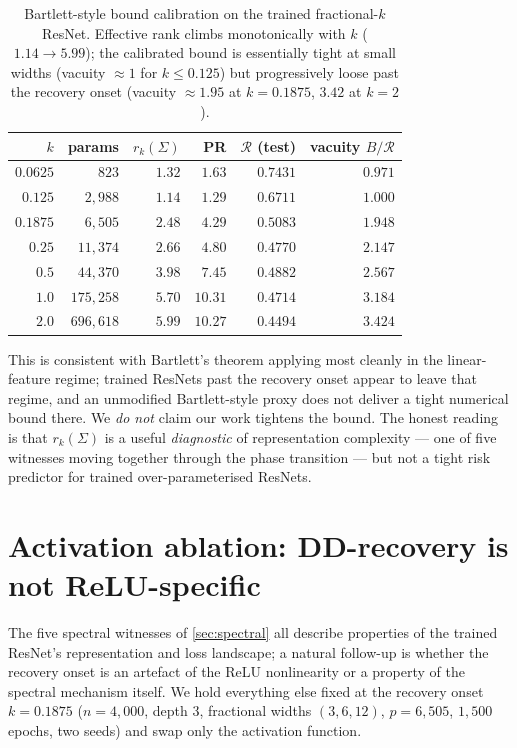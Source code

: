 \begin{table}[t]
  \centering
  \small
  \caption{Bartlett-style bound calibration on the trained fractional-$k$ ResNet. Effective rank climbs monotonically with $k$ ($1.14\!\to\!5.99$); the calibrated bound is essentially tight at small widths (vacuity $\approx 1$ for $k \le 0.125$) but progressively loose past the recovery onset (vacuity $\approx 1.95$ at $k\!=\!0.1875$, $3.42$ at $k\!=\!2$).}
  \label{tab:bartlett-vacuity}
  \begin{tabular}{@{}rrrrrr@{}}
    \toprule
    $k$ & params & $r_k(\Sigma)$ & PR & $\mathcal{R}$ (test) & vacuity $B/\mathcal{R}$ \\
    \midrule
    $0.0625$ & $823$    & $1.32$ & $1.63$  & $0.7431$ & $\mathbf{0.971}$ \\
    $0.125$  & $2{,}988$ & $1.14$ & $1.29$  & $0.6711$ & $\mathbf{1.000}$ \\
    $0.1875$ & $6{,}505$ & $2.48$ & $4.29$  & $0.5083$ & $1.948$ \\
    $0.25$   & $11{,}374$ & $2.66$ & $4.80$  & $0.4770$ & $2.147$ \\
    $0.5$    & $44{,}370$ & $3.98$ & $7.45$  & $0.4882$ & $2.567$ \\
    $1.0$    & $175{,}258$ & $5.70$ & $10.31$ & $0.4714$ & $3.184$ \\
    $2.0$    & $696{,}618$ & $5.99$ & $10.27$ & $0.4494$ & $\mathbf{3.424}$ \\
    \bottomrule
  \end{tabular}
\end{table}

This is consistent with Bartlett's theorem applying most cleanly in the linear-feature regime; trained ResNets past the recovery onset appear to leave that regime, and an unmodified Bartlett-style proxy does not deliver a tight numerical bound there. We \emph{do not} claim our work tightens the bound. The honest reading is that $r_k(\Sigma)$ is a useful \emph{diagnostic} of representation complexity --- one of five witnesses moving together through the phase transition --- but not a tight risk predictor for trained over-parameterised ResNets.

\section{Activation ablation: DD-recovery is not ReLU-specific}
\label{app:activation}

The five spectral witnesses of \cref{sec:spectral} all describe properties of the trained ResNet's representation and loss landscape; a natural follow-up is whether the recovery onset is an artefact of the ReLU nonlinearity or a property of the spectral mechanism itself. We hold everything else fixed at the recovery onset $k\!=\!0.1875$ ($n\!=\!4{,}000$, depth $3$, fractional widths $(3,6,12)$, $p\!=\!6{,}505$, $1{,}500$ epochs, two seeds) and swap only the activation function.

